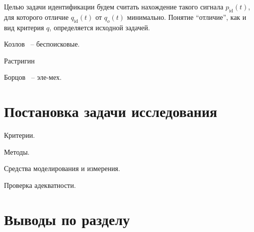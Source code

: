 Целью задачи идентификации будем считать нахождение
такого сигнала $p_\mathrm{id}(t)$, для которого
отличие $q_\mathrm{id}(t)$ от $q_o(t)$ минимально.
Понятие ``отличие'', как и вид критерия $q$, определяется исходной задачей.





Козлов~\cite{kozlov_nosearch_sns} -- беспоисковые.

Растригин~\cite{rastr_stat_meth_search,rastr_seu,rastr_intro,rastr_adop_complex_sys,rastr_rand_search}

Борцов~\cite{borcov} -- эле-мех.




\section{Постановка задачи исследования}  %

Критерии.

Методы.

Средства моделирования и измерения.

Проверка адекватности.




\section{Выводы по разделу \thechapter}  %





